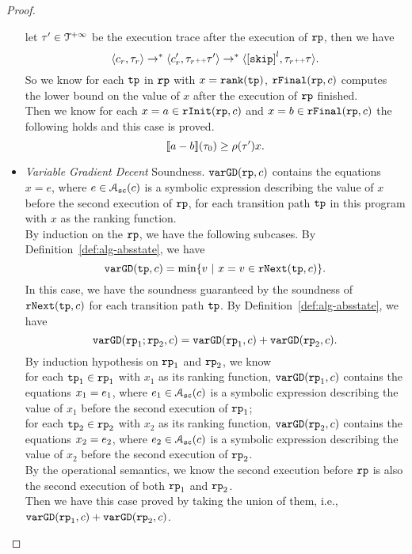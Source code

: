 \begin{proof}
\begin{itemize}
 let $\mathtt{\tau}' \in \mathcal{T}^{+\infty}$ be the execution trace after the execution of $\mathtt{rp}$,  then we have
 \[
   \config{c_r, \trace_r} \to^* \config{c_r', \trace_r \tracecat \trace'} \to^* \config{\clabel{\eskip}^{l}, \trace_r \tracecat \trace}.
 \]
So we know for each $\mathtt{tp}$ in $\mathtt{rp}$ with $x = \mathtt{rank}(\mathtt{tp})$,
$\mathtt{rFinal}(\mathtt{rp}, c)$ computes the lower bound on the value of $x$ after the execution of $\mathtt{rp}$ finished.
\\
Then we know for each $ x = a \in \mathtt{rInit}(\mathtt{rp}, c) $ and $ x = b \in \mathtt{rFinal}(\mathtt{rp}, c) $
the following holds and this case is proved.
\[
  \llbracket a - b \rrbracket(\mathtt{\tau}_0) \geq \rho(\mathtt{\tau}') x.
\]
\item   \emph{Variable Gradient Decent} Soundness.
$\mathtt{varGD}(\mathtt{rp}, c)$ contains the equations $x = e$, where $e \in \mathcal{A}_{\mathtt{sc}}(c)$ is a
  symbolic expression describing the value of $x$ before the second execution of $\mathtt{rp}$,
  for each transition path $\mathtt{tp}$ in this program with $x$ as the ranking function.
\\
 By induction on the $\mathtt{rp}$, we have the following subcases.
 \subcaseL{$\rprog = \tpath$}
 By Definition~\ref{def:alg-absstate}, we have
\[
   \varGD(\tpath, c) =  \min\left\{v  ~|~ x = v \in \rfnext(\tpath, c) \right\}.
\]
In this case, we have the soundness guaranteed by the soundness of $\mathtt{rNext}(\mathtt{tp}, c)$ for each transition path $\mathtt{tp}$.
 By Definition~\ref{def:alg-absstate}, we have
\[
\mathtt{varGD}(\mathtt{rp}_1;\mathtt{rp}_2, c) =  \mathtt{varGD}(\mathtt{rp}_1, c) + \mathtt{varGD}(\mathtt{rp}_2, c).
\]
By induction hypothesis on $\mathtt{rp}_1$ and $\mathtt{rp}_2$, we know
\\
for each $\mathtt{tp}_1 \in \mathtt{rp}_1$ with $x_1$ as its ranking function,
$\mathtt{varGD}(\mathtt{rp}_1, c)$ contains the equations $x_1 = e_1$, where $e_1 \in \mathcal{A}_{\mathtt{sc}}(c)$ is a
symbolic expression describing the value of $x_1$ before the second execution of $\mathtt{rp}_1$;
\\
for each $\mathtt{tp}_2 \in \mathtt{rp}_2$ with $x_2$ as its ranking function,
$\mathtt{varGD}(\mathtt{rp}_2, c)$ contains the equations $x_2 = e_2$, where $e_2 \in \mathcal{A}_{\mathtt{sc}}(c)$ is a
symbolic expression describing the value of $x_2$ before the second execution of $\mathtt{rp}_2$.
\\
By the operational semantics, we know the second execution before $\mathtt{rp}$ is also the second execution of both $\mathtt{rp}_1$ and $\mathtt{rp}_2$.
\\
Then we have this case proved by taking the union of them, i.e., $\mathtt{varGD}(\mathtt{rp}_1, c) + \mathtt{varGD}(\mathtt{rp}_2, c)$.

\end{itemize}
\end{proof}
